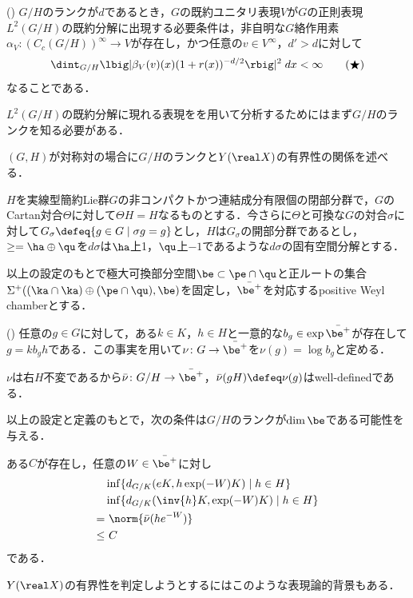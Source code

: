 \begin{thm*}(\cite[pp.~665--6]{ber88})\label{thm:plancherel}
  $G/H$のランクが$d$であるとき，$G$の既約ユニタリ表現$V$が$G$の正則表現$L^2(G/H)$の既約分解に出現する必要条件は，非自明な$G$絡作用素$\alpha_V\colon (C_c(G/H))^{\infty}\to V $が存在し，かつ任意の$v\in V^{\infty} $，$d' > d$に対して
  \begin{align}
    \dint_{G/H}\lbig|\beta_V(v)(x)(1+r(x))^{-d/2} \rbig|^2\; dx < \infty\label{eq:ber88}\tag{$\bigstar$}
  \end{align}
  なることである．%
\end{thm*}

$L^2(G/H)$の既約分解に現れる表現をを用いて分析するためにはまず$G/H$のランクを知る必要がある．

$(G,H)$が対称対の場合に$G/H$のランクと$Y(\real X) $の有界性の関係を述べる．
\begin{setting*}
  $H$を実線型簡約Lie群$G$の非コンパクトかつ連結成分有限個の閉部分群で，$G$のCartan対合$\Theta$に対して$\Theta H = H$なるものとする．今さらに$\Theta $と可換な$G$の対合$\sigma$に対して$G_{\sigma}\defeq \{g\in G \mid \sigma g = g \} $とし，$H$は$G_{\sigma} $の開部分群であるとし，$\ge = \ha\oplus \qu $を$d\sigma $は$\ha$上1，$\qu$上${-1}$であるような$d\sigma$の固有空間分解とする．

  以上の設定のもとで極大可換部分空間$\be\subset \pe\cap \qu $と正ルートの集合$\Sigma^{+}((\ka\cap\ka)\oplus(\pe\cap \qu), \be ) $を固定し，$\bar{\be^{+}} $を対応するpositive Weyl chamberとする．
\end{setting*}
\begin{thmdef*}(\cite[p.~151]{kk16})
  任意の$g\in G$に対して，ある$k\in K$，$h\in H$と一意的な$b_g\in \exp\bar{\be^{+}} $が存在して$g = kb_gh$である．この事実を用いて$\nu\colon G\to \bar{\be^{+}} $を$\nu(g) = \log b_{g} $と定める．
\end{thmdef*}

$\nu$は右$H$不変であるから$\bar{\nu}\colon G/H\to \bar{\be^{+}} $，$\bar{\nu}(gH) \defeq \nu(g) $はwell-definedである．

以上の設定と定義のもとで，次の条件は$G/H$のランクが$\dim \be $である可能性を与える．
\begin{cond*}
  ある$C$が存在し，任意の$ W\in \bar{\be^{+}} $に対し
  \begin{align*}
    &\inf\{d_{G/K}(eK,  h\exp(-W)K)\mid h\in H \}  \\
    &\inf\{d_{G/K}(\inv{h}K,  \exp(-W)K)\mid h\in H \}  \\
    =&\ \norm{\bar{\nu}(he^{-W})} \\
    \leq&\ C
  \end{align*}
  である．
\end{cond*}


$Y(\real X) $の有界性を判定しようとするにはこのような表現論的背景もある．
